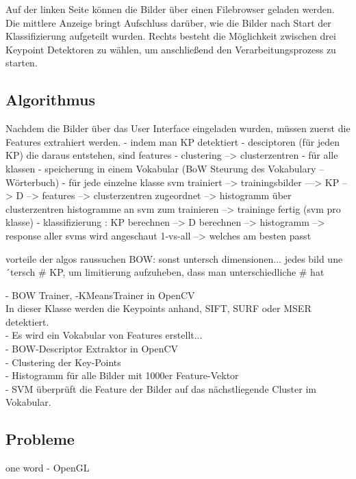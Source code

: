 \documentclass[liststotoc,11pt,a4paper]{article}
\begin{document}

Auf der linken Seite können die Bilder über einen Filebrowser geladen werden. Die mittlere Anzeige bringt Aufschluss darüber, wie die Bilder nach Start der Klassifizierung aufgeteilt wurden. Rechts besteht die Möglichkeit zwischen drei Keypoint Detektoren zu wählen, um anschließend den Verarbeitungsprozess zu starten. %

\subsection{Algorithmus}


Nachdem die Bilder über das User Interface eingeladen wurden, müssen zuerst die Features extrahiert werden. 
- indem man KP detektiert
- desciptoren (für jeden KP) die daraus entstehen, sind features
- clustering --> clusterzentren
- für alle klassen
- speicherung in einem Vokabular (BoW Steurung des Vokabulary -- Wörterbuch)
- für jede einzelne klasse svm trainiert --> trainingsbilder ---> KP --> D --> features --> clusterzentren zugeordnet --> histogramm über clusterzentren 
histogramme an svm zum trainieren --> traininge fertig (svm pro klasse)
- klassifizierung : KP berechnen --> D berechnen --> histogramm --> response aller svms wird angeschaut 1-vs-all --> welches am besten passt

vorteile der algos raussuchen
BOW: sonst untersch dimensionen... jedes bild une´tersch # KP, um limitierung aufzuheben, dass man unterschiedliche # hat


- BOW Trainer, -KMeansTrainer in OpenCV\\
In dieser Klasse werden die Keypoints anhand, SIFT, SURF oder MSER detektiert. \\
- Es wird ein Vokabular von Features erstellt...\\ %
- BOW-Descriptor Extraktor in OpenCV\\
- Clustering der Key-Points\\
- Histogramm für alle Bilder mit 1000er Feature-Vektor\\

- SVM überprüft die Feature der Bilder auf das nächstliegende Cluster im Vokabular.\\


\subsection{Probleme}
one word - OpenGL
\end{document}
